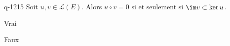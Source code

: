 \begin{truefalse}{q-1215}
Soit $u, v \in \mathcal{L}(E)$. Alors $u\circ v=0$ si et seulement si $\im v \subset \ker u$.
\item* Vrai
\item Faux
\end{truefalse}


